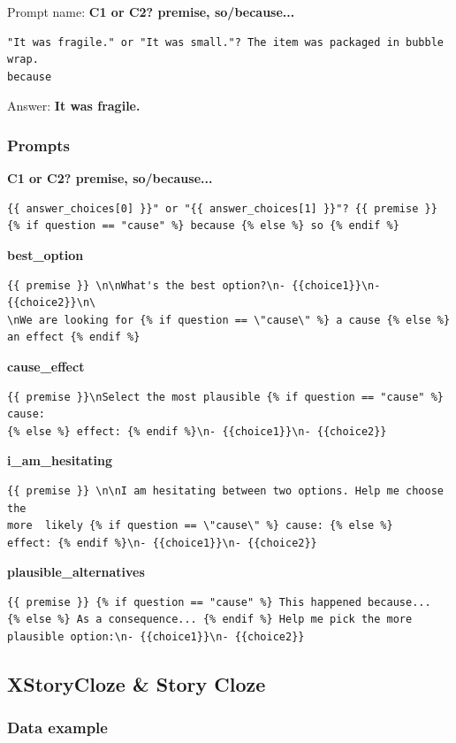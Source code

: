 \documentclass[twoside,11pt]{article}
\begin{document}
Prompt name: \textbf{C1 or C2? premise, so/because...}
\begin{verbatim}
"It was fragile." or "It was small."? The item was packaged in bubble wrap.  
because
\end{verbatim}
Answer: \textbf{It was fragile.}

\subsubsection{Prompts}

\noindent\textbf{C1 or C2? premise, so/because...}
\begin{verbatim}
{{ answer_choices[0] }}" or "{{ answer_choices[1] }}"? {{ premise }} 
{% if question == "cause" %} because {% else %} so {% endif %}
\end{verbatim}

\noindent\textbf{best\_option}
\begin{verbatim}
{{ premise }} \n\nWhat's the best option?\n- {{choice1}}\n- {{choice2}}\n\
\nWe are looking for {% if question == \"cause\" %} a cause {% else %} 
an effect {% endif %}    
\end{verbatim}

\noindent\textbf{cause\_effect}
\begin{verbatim}
{{ premise }}\nSelect the most plausible {% if question == "cause" %} cause: 
{% else %} effect: {% endif %}\n- {{choice1}}\n- {{choice2}}
\end{verbatim}

\noindent\textbf{i\_am\_hesitating}
\begin{verbatim}
{{ premise }} \n\nI am hesitating between two options. Help me choose the 
more  likely {% if question == \"cause\" %} cause: {% else %} 
effect: {% endif %}\n- {{choice1}}\n- {{choice2}}      
\end{verbatim}

\noindent\textbf{plausible\_alternatives}
\begin{verbatim}
{{ premise }} {% if question == "cause" %} This happened because... 
{% else %} As a consequence... {% endif %} Help me pick the more 
plausible option:\n- {{choice1}}\n- {{choice2}}
\end{verbatim}


\subsection{XStoryCloze \& Story Cloze}

\subsubsection{Data example}
\end{document}
